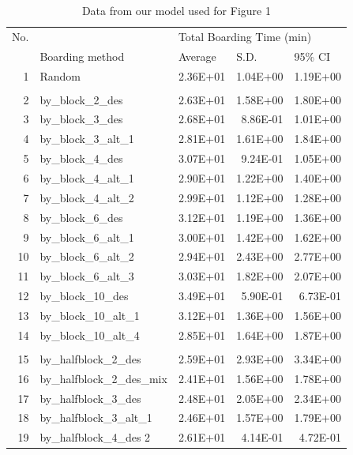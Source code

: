 \documentclass[11pt]{article}
\begin{document}
\begin{table}[htbp]
  \centering
  \caption{Data from our model used for Figure 1}
    \begin{tabular}{rlrrr}
    \multicolumn{1}{l}{No.} &       & \multicolumn{3}{l}{Total Boarding Time (min)} \\
          & Boarding method & \multicolumn{1}{l}{Average} & \multicolumn{1}{l}{S.D.} & \multicolumn{1}{l}{95\% CI} \\
    1     & Random & 2.36E+01 & 1.04E+00 & 1.19E+00 \\
          &       &       &       &  \\
    2     & by\_block\_2\_des & 2.63E+01 & 1.58E+00 & 1.80E+00 \\
    3     & by\_block\_3\_des & 2.68E+01 & 8.86E-01 & 1.01E+00 \\
    4     & by\_block\_3\_alt\_1 & 2.81E+01 & 1.61E+00 & 1.84E+00 \\
    5     & by\_block\_4\_des & 3.07E+01 & 9.24E-01 & 1.05E+00 \\
    6     & by\_block\_4\_alt\_1 & 2.90E+01 & 1.22E+00 & 1.40E+00 \\
    7     & by\_block\_4\_alt\_2 & 2.99E+01 & 1.12E+00 & 1.28E+00 \\
    8     & by\_block\_6\_des & 3.12E+01 & 1.19E+00 & 1.36E+00 \\
    9     & by\_block\_6\_alt\_1 & 3.00E+01 & 1.42E+00 & 1.62E+00 \\
    10    & by\_block\_6\_alt\_2 & 2.94E+01 & 2.43E+00 & 2.77E+00 \\
    11    & by\_block\_6\_alt\_3 & 3.03E+01 & 1.82E+00 & 2.07E+00 \\
    12    & by\_block\_10\_des & 3.49E+01 & 5.90E-01 & 6.73E-01 \\
    13    & by\_block\_10\_alt\_1 & 3.12E+01 & 1.36E+00 & 1.56E+00 \\
    14    & by\_block\_10\_alt\_4 & 2.85E+01 & 1.64E+00 & 1.87E+00 \\
          &       &       &       &  \\
    15    & by\_halfblock\_2\_des & 2.59E+01 & 2.93E+00 & 3.34E+00 \\
    16    & by\_halfblock\_2\_des\_mix & 2.41E+01 & 1.56E+00 & 1.78E+00 \\
    17    & by\_halfblock\_3\_des & 2.48E+01 & 2.05E+00 & 2.34E+00 \\
    18    & by\_halfblock\_3\_alt\_1 & 2.46E+01 & 1.57E+00 & 1.79E+00 \\
    19    & by\_halfblock\_4\_des 2 & 2.61E+01 & 4.14E-01 & 4.72E-01 \\

\end{tabular}
\end{table}
\end{document}
